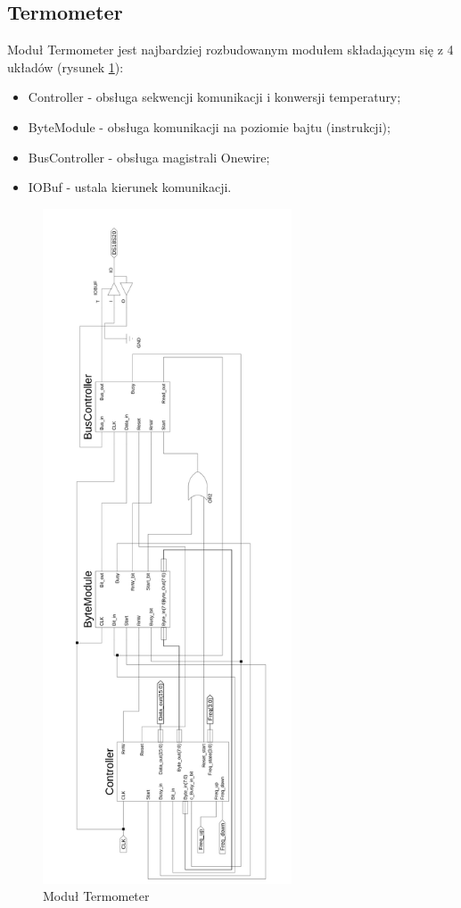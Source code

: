 \documentclass[a4paper]{article}
\begin{document}
\subsection{Termometer}
Moduł Termometer jest najbardziej rozbudowanym modułem składającym się z 4 układów (rysunek \ref{termometer}):
\begin{itemize}
\item Controller - obsługa sekwencji komunikacji i konwersji temperatury;
\item ByteModule - obsługa komunikacji na poziomie bajtu (instrukcji);
\item BusController - obsługa magistrali Onewire;
\item IOBuf - ustala kierunek komunikacji.
\end{itemize}

\begin{figure}[!h]
\begin{center}
\includegraphics[height=20cm]{graphics/termometer.png}
\end{center}
\caption{Moduł Termometer}
\label{termometer}
\end{figure}
\end{document}
